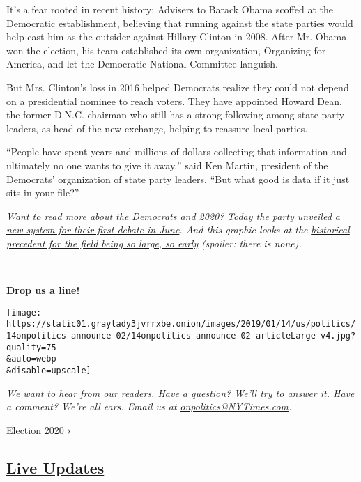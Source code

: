 It's a fear rooted in recent history: Advisers to Barack Obama scoffed
at the Democratic establishment, believing that running against the
state parties would help cast him as the outsider against Hillary
Clinton in 2008. After Mr. Obama won the election, his team established
its own organization, Organizing for America, and let the Democratic
National Committee languish.

But Mrs. Clinton's loss in 2016 helped Democrats realize they could not
depend on a presidential nominee to reach voters. They have appointed
Howard Dean, the former D.N.C. chairman who still has a strong following
among state party leaders, as head of the new exchange, helping to
reassure local parties.

``People have spent years and millions of dollars collecting that
information and ultimately no one wants to give it away,'' said Ken
Martin, president of the Democrats' organization of state party leaders.
``But what good is data if it just sits in your file?''

\emph{Want to read more about the Democrats and 2020?}
\href{https://www.nytimes3xbfgragh.onion/2019/02/14/us/politics/democratic-debates-2020.html}{\emph{Today
the party unveiled a new system for their first debate in June}}\emph{.
And this graphic looks at the}
\href{https://www.nytimes3xbfgragh.onion/interactive/2019/02/14/us/politics/2020-democratic-candidates-president.html}{\emph{historical
precedent for the field being so large, so early}} \emph{(spoiler: there
is none).}

\emph{\_\_\_\_\_\_\_\_\_\_\_\_\_\_\_\_\_\_\_\_}

\textbf{Drop us a line!}

\texttt{[image: https://static01.graylady3jvrrxbe.onion/images/2019/01/14/us/politics/14onpolitics-announce-02/14onpolitics-announce-02-articleLarge-v4.jpg?quality=75\\\&auto=webp\\\&disable=upscale]}

\emph{We want to hear from our readers. Have a question? We'll try to
answer it. Have a comment? We're all ears. Email us at}
\href{mailto:onpolitics@NYTimes.com}{\emph{onpolitics@NYTimes.com}}\emph{.}

\href{https://www.nytimes3xbfgragh.onion/news-event/2020-election}{Election
2020 ›}

\hypertarget{live-updates}{%
\subsection{\texorpdfstring{\href{https://www.nytimes3xbfgragh.onion/live/2020/09/08/us/trump-vs-biden}{Live
Updates}}{Live Updates}}\label{live-updates}}

